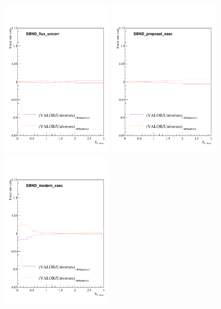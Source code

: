 \begin{figure}[h!]
    \includegraphics[width = 0.49\textwidth, height = 0.56184\textwidth]{figures-chap6/tweak_pdf_N_nue/universe_valor_double_ratios_SBND_flux_uncorr.pdf}
    \includegraphics[width = 0.49\textwidth, height = 0.56184\textwidth]{figures-chap6/tweak_pdf_N_nue/universe_valor_double_ratios_SBND_proposal_xsec.pdf}
    \includegraphics[width = 0.49\textwidth, height = 0.56184\textwidth]{figures-chap6/tweak_pdf_N_nue/universe_valor_double_ratios_SBND_modern_xsec.pdf}

\end{figure}
